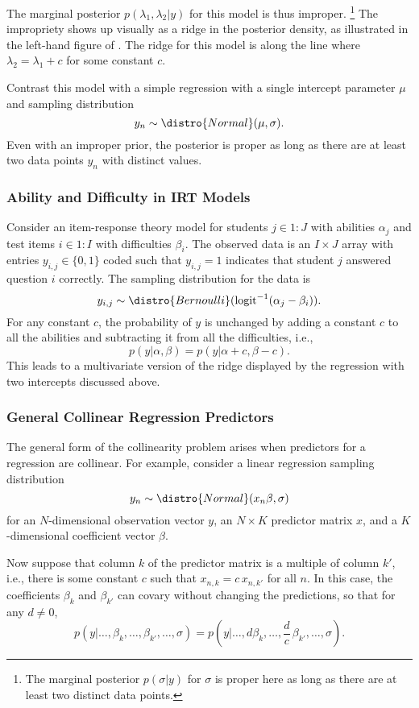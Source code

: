 The marginal posterior $p(\lambda_1,\lambda_2|y)$ for this model is
thus improper.%
%
\footnote{The marginal posterior $p(\sigma|y)$ for $\sigma$ is proper
  here as long as there are at least two distinct data points.}
%
The impropriety shows up visually as a ridge in the posterior density,
as illustrated in the left-hand figure of
.  The ridge for this model is
along the line where $\lambda_2 = \lambda_1 + c$ for some constant
$c$.  

Contrast this model with a simple regression with a single intercept
parameter $\mu$ and sampling distribution
\[
y_n \sim \distro{Normal}(\mu,\sigma).
\]
Even with an improper prior, the posterior is proper as long as there
are at least two data points $y_n$ with distinct values.


\subsubsection{Ability and Difficulty in IRT Models}

Consider an item-response theory model for students $j \in 1{:}J$ with
abilities $\alpha_j$ and test items $i \in 1{:}I$ with difficulties
$\beta_i$.  The observed data is an $I \times J$ array with entries
$y_{i, j} \in \{ 0, 1 \}$ coded such that $y_{i, j} = 1$ indicates that
student $j$ answered question $i$ correctly.  The sampling
distribution for the data is
%
\[
y_{i, j} \sim \distro{Bernoulli}(\mbox{logit}^{-1}(\alpha_j - \beta_i)).
\]
%
For any constant $c$, the probability of $y$ is unchanged by adding a
constant $c$ to all the abilities and subtracting it from all the
difficulties, i.e.,
%
\[
p(y | \alpha, \beta)
= 
p(y | \alpha + c, \beta - c).
\]
%
This leads to a multivariate version of the ridge displayed by the
regression with two intercepts discussed above.

\subsubsection{General Collinear Regression Predictors}

The general form of the collinearity problem arises when predictors
for a regression are collinear.  For example, consider a linear
regression sampling distribution
\[
y_n \sim \distro{Normal}(x_n \beta, \sigma)
\]
for an $N$-dimensional observation vector $y$, an $N \times K$ predictor
matrix $x$, and a $K$-dimensional coefficient vector $\beta$.

Now suppose that column $k$ of the predictor matrix is a multiple of
column $k'$, i.e., there is some constant $c$ such that $x_{n,k} = c
\, x_{n,k'}$ for all $n$.  In this case, the coefficients $\beta_k$
and $\beta_{k'}$ can covary without changing the predictions, so that
for any $d \neq 0$,
%
\[
p(y | \ldots, \beta_k, \ldots, \beta_{k'}, \ldots, \sigma)
=
p(y | \ldots, d  \beta_k, \ldots, \frac{d}{c} \, \beta_{k'}, \ldots,
\sigma).
\]

